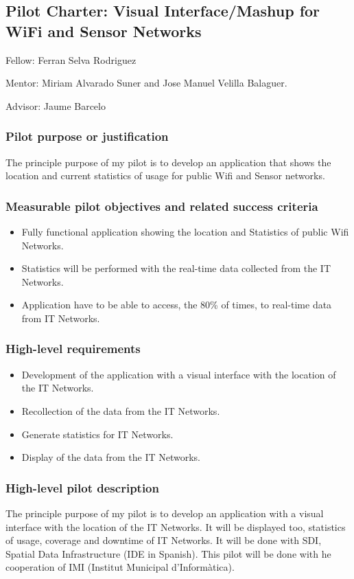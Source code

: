 \documentclass[draftclsnofoot,12pt,journal,onecolumn]{IEEEtran}
\begin{document}
\subsection{Pilot Charter: Visual Interface/Mashup for WiFi and Sensor Networks}
\label{sec:mnp}

Fellow: Ferran Selva Rodriguez

Mentor: Miriam Alvarado Suner and Jose Manuel Velilla Balaguer. 

Advisor: Jaume Barcelo

\subsubsection{Pilot purpose or justification}
The principle purpose of my pilot is to develop an application that shows the location and current statistics of usage for public Wifi and Sensor networks.

\subsubsection{Measurable pilot objectives and related success criteria}
\begin{itemize}
\item Fully functional application showing the location and Statistics of public Wifi Networks.
\item Statistics will be performed with the real-time data collected from the IT Networks.
\item Application have to be able to access, the 80\% of times, to real-time data from IT Networks.

\end{itemize}

\subsubsection{High-level requirements}
\begin{itemize}
\item Development of the application with a visual interface with the location of the IT Networks.
\item Recollection of the data from the IT Networks.
\item Generate statistics for IT Networks.
\item Display of the data from the IT Networks.

\end{itemize}

\subsubsection{High-level pilot description}
The principle purpose of my pilot is to develop an application with a visual interface with the location of the IT Networks. It will be displayed too, statistics of usage, coverage and downtime of IT Networks. It will be done with SDI, Spatial Data Infrastructure (IDE in Spanish). This pilot will be done with he cooperation of IMI (Institut Municipal d'Informàtica).
\end{document}
